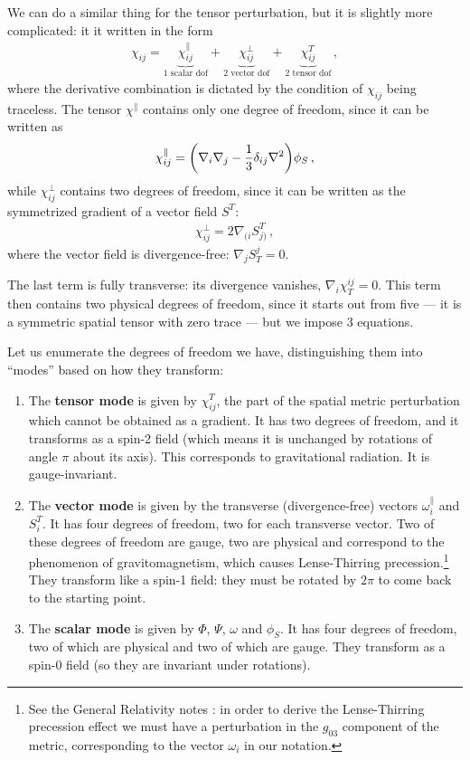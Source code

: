 \documentclass[main.tex]{subfiles}
\begin{document}
We can do a similar thing for the tensor perturbation, but it is slightly more complicated: it it written in the form 
%
\begin{align}
\chi_{ij} = 
\underbrace{\chi_{ij}^{\parallel}}_{\text{1 scalar dof}} + 
\underbrace{\chi_{ij}^{\perp}}_{\text{2 vector dof}} + 
\underbrace{\chi_{ij}^{T}}_{\text{2 tensor dof}} 
\,,
\end{align}
%
where the derivative combination is dictated by the condition of \(\chi_{ij}\) being traceless. 
The tensor \(\chi^{\parallel}\) contains only one degree of freedom, since it can be written as 
%
\begin{align}
\chi^{\parallel}_{ij} = \qty(\nabla_{i} \nabla_{j} - \frac{1}{3} \delta_{ij}\nabla^2) \phi_{S}
\,,
\end{align}
%
while \(\chi^{\perp}_{ij}\) contains two degrees of freedom, since it can be written as the symmetrized gradient of a vector field \(S^{T}\):
%
\begin{align}
\chi^{\perp}_{ij} = 2 \nabla_{(i} S_{j)}^{T}
\,,
\end{align}
%
where the vector field is divergence-free: \(\nabla_{j} S^{j}_{T} = 0\).

The last term is fully transverse: its divergence vanishes, \(\nabla_{i} \chi^{ij}_{T} = 0\).  This term then contains two physical degrees of freedom, since it starts out from five --- it is a symmetric spatial tensor with zero trace --- but we impose 3 equations.

Let us enumerate the degrees of freedom we have, distinguishing them into ``modes'' based on how they transform:
\begin{enumerate}
  \item The \textbf{tensor mode} is given by \(\chi^{T}_{ij}\), the part of the spatial metric perturbation which cannot be obtained as a gradient. It has two degrees of freedom, and it transforms as a spin-2 field (which means it is unchanged by rotations of angle \(\pi \) about its axis). This corresponds to gravitational radiation. It is gauge-invariant.
  \item The \textbf{vector mode} is given by the transverse (divergence-free) vectors \(\omega_{i}^{\parallel}\) and \(S^{T}_{i}\). It has four degrees of freedom, two for each transverse vector. Two of these degrees of freedom are gauge, two are physical and correspond to the phenomenon of gravitomagnetism, which causes Lense-Thirring precession.\footnote{See the General Relativity notes \cite[equation 341]{tissinoGeneralRelativityNotes2020}: in order to derive the Lense-Thirring precession effect we must have a perturbation in the \(g_{03} \) component of the metric, corresponding to the vector \(\omega_{i}\) in our notation.} They transform like a spin-1 field: they must be rotated by \(2 \pi \) to come back to the starting point.
  \item The \textbf{scalar mode} is given by \(\Phi \), \(\Psi \), \(\omega\) and \(\phi_{S}\). It has four degrees of freedom, two of which are physical and two of which are gauge. They transform as a spin-0 field (so they are invariant under rotations). 
\end{enumerate}
\end{document}
